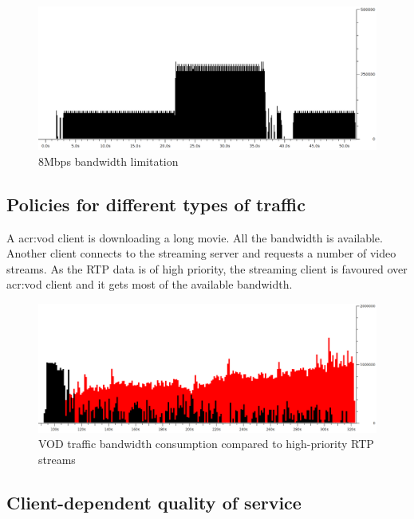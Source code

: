 \documentclass[11pt]{book}
\begin{document}
        \begin{figure}[H]
          \begin{center}
            \includegraphics[width=.7\textwidth]{img/test-case/limit.png}
          \end{center}

          \caption{8Mbps bandwidth limitation}
          \label{fig:uc:limit}
        \end{figure}


      \subsection{Policies for different types of traffic}
      \label{sub:uc:traffic}

        A \gls{acr:vod} client is downloading a long movie. All the bandwidth is available. Another client connects to the
        streaming server and requests a number of video streams. As the RTP data is of high priority, the streaming
        client is favoured over \gls{acr:vod} client and it gets most of the available bandwidth.

        \begin{figure}[H]
          \begin{center}
            \includegraphics[width=.7\textwidth]{img/test-case/vod-rtp.png}
          \end{center}

          \caption{VOD traffic bandwidth consumption compared to high-priority RTP streams}
        \end{figure}


      \subsection{Client-dependent quality of service}
      \label{sub:uc:client}
\end{document}
